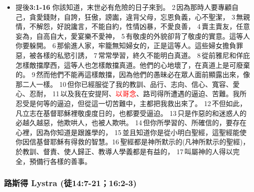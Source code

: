 \begin{itemize}
\item 提後\textbf{3:1-16} 你該知道，末世必有危險的日子來到。 2 因為那時人要專顧自己，貪愛錢財，自誇，狂傲，謗讟，違背父母，忘恩負義，心不聖潔， 3 無親情，不解怨，好說讒言，不能自約，性情凶暴，不愛良善， 4 賣主賣友，任意妄為，自高自大，愛宴樂不愛神， 5 有敬虔的外貌卻背了敬虔的實意。這等人你要躲開。 6 那偷進人家，牢籠無知婦女的，正是這等人。這些婦女擔負罪惡，被各樣的私慾引誘， 7 常常學習，終久不能明白真道。 8 從前雅尼和佯庇怎樣敵擋摩西，這等人也怎樣敵擋真道。他們的心地壞了，在真道上是可廢棄的。 9 然而他們不能再這樣敵擋，因為他們的愚昧必在眾人面前顯露出來，像那二人一樣。 10 但你已經服從了我的教訓、品行、志向、信心、寬容、愛心、忍耐， 11 以及我在安提阿、\textcolor{red}{以哥念}、路司得所遭遇的逼迫、苦難。我所忍受是何等的逼迫，但從這一切苦難中，主都把我救出來了。 12 不但如此，凡立志在基督耶穌裡敬虔度日的，也都要受逼迫。 13 只是作惡的和迷惑人的必越久越惡，他欺哄人，也被人欺哄。 14 但你所學習的、所確信的，要存在心裡，因為你知道是跟誰學的， 15 並且知道你是從小明白聖經，這聖經能使你因信基督耶穌有得救的智慧。16 聖經都是神所默示的(凡神所默示的聖經)，於教訓、督責、使人歸正、教導人學義都是有益的， 17 叫屬神的人得以完全，預備行各樣的善事。
\end{itemize}


\subsubsection{路斯得 Lystra (徒14:7-21；16:2-3)}

